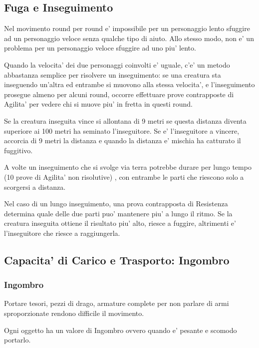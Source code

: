 \documentclass[a4paper,11pt,twoside,openany]{book}
\begin{document}
{\subsection{Fuga e Inseguimento}

Nel movimento round per round e' impossibile per un personaggio lento sfuggire ad un personaggio veloce senza qualche tipo di aiuto. Allo stesso modo, non e' un problema per un personaggio veloce sfuggire ad uno piu' lento.

Quando la velocita' dei due personaggi coinvolti e' uguale, c'e' un metodo abbastanza semplice per risolvere un inseguimento: se una creatura sta inseguendo un'altra ed entrambe si muovono alla stessa velocita', e l'inseguimento prosegue almeno per alcuni round, occorre effettuare prove contrapposte di Agilita' per vedere chi si muove piu' in fretta in questi round.

Se la creatura inseguita vince si allontana di 9 metri se questa distanza diventa superiore ai 100 metri ha seminato l'inseguitore. Se e' l'inseguitore a vincere, accorcia di 9 metri la distanza e quando la distanza e' mischia ha catturato il fuggitivo.

A volte un inseguimento che si svolge via terra potrebbe durare per lungo tempo (10 prove di Agilita' non risolutive) , con entrambe le parti che riescono solo a scorgersi a distanza.

Nel caso di un lungo inseguimento, una prova contrapposta di Resistenza determina quale delle due parti puo' mantenere piu' a lungo il ritmo. Se la creatura inseguita ottiene il risultato piu' alto, riesce a fuggire, altrimenti e' l'inseguitore che riesce a raggiungerla.

\subsection{Capacita' di Carico e Trasporto: Ingombro}

\label{capacituxe0-di-carico-e-trasporto-ingombro}

\subsubsection{Ingombro}

Portare tesori, pezzi di drago, armature complete per non parlare di armi sproporzionate rendono difficile il movimento.

Ogni oggetto ha un valore di Ingombro ovvero quando e' pesante e scomodo portarlo.


}
\end{document}
